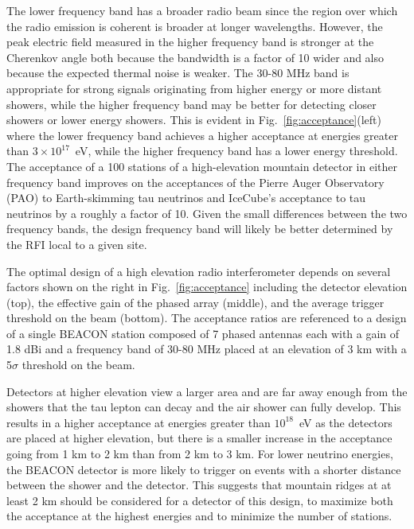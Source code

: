 \documentclass{PoS}
\begin{document}
The lower frequency band has a broader radio beam since the region over which the radio emission is coherent is broader at longer wavelengths. However, the peak electric field measured in the higher frequency band is stronger at the Cherenkov angle both because the bandwidth is a factor of 10 wider and also because the expected thermal noise is weaker. The 30-80 MHz band is appropriate for strong signals originating from higher energy or more distant showers, while the higher frequency band may be better for detecting closer showers or lower energy showers. This is evident in Fig.~\ref{fig:acceptance}(left) where the lower frequency band achieves a higher acceptance at energies greater than $3\times10^{17}$~eV, while the higher frequency band has a lower energy threshold.  The acceptance of a 100 stations of a high-elevation mountain detector in either frequency band improves on the acceptances of the Pierre Auger Observatory (PAO) to Earth-skimming tau neutrinos and IceCube's acceptance to tau neutrinos by a roughly a factor of 10. Given the small differences between the two frequency bands, the design frequency band will likely be better determined by the RFI local to a given site. 

The optimal design of a high elevation radio interferometer depends on several factors  shown on the right in Fig.~\ref{fig:acceptance} including the detector elevation (top), the effective gain of the phased array (middle), and the average trigger threshold on the beam (bottom). The acceptance ratios are referenced to a design of a single BEACON station composed of 7 phased antennas each with a gain of 1.8 dBi and a frequency band of 30-80 MHz placed at an elevation of 3 km with a 5$\sigma$ threshold on the beam.

Detectors at higher elevation view a larger area and are far away enough from the showers that the tau lepton can decay and the air shower can fully develop. This results in a higher acceptance at energies greater than $10^{18}$~eV as the detectors are placed at higher elevation, but there is a smaller increase in the acceptance going from 1 km to 2 km than from 2 km to 3 km. For lower neutrino energies, the BEACON detector is more likely to trigger on events with a shorter distance between the shower and the detector. This suggests that mountain ridges at at least 2 km should be considered for a detector of this design, to maximize both the acceptance at the highest energies and to minimize the number of stations.
\end{document}
